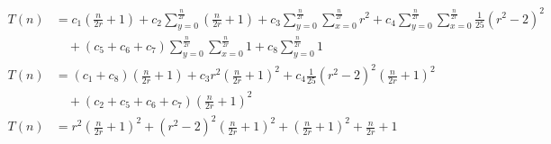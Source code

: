 \begin{subequations}
\label{eq:linedetection-clarke}
\begin{align}
\label{eq:linedetection-clarke-1}
T(n)& = c_{1} (\tfrac{n}{2r} + 1) + c_{2} \sum_{y=0}^{\tfrac{n}{2r}}
 \left(\tfrac{n}{2r} + 1\right) + c_3 \sum_{y=0}^{\tfrac{n}{2r}}
 \sum_{x=0}^{\tfrac{n}{2r}} r^2 + c_4 \sum_{y=0}^{\tfrac{n}{2r}}
 \sum_{x=0}^{\tfrac{n}{2r}} \tfrac{1}{25}(r^2 - 2)^2 \\
& \quad + (c_{5} + c_{6} + c_{7}) \sum_{y=0}^{\tfrac{n}{2r}} \sum_{x=0}^{\tfrac{n}{2r}} 1
+ c_8 \sum_{y=0}^{\tfrac{n}{2r}} 1 \nonumber \\
\label{eq:linedetection-clarke-2}
T(n)& = (c_{1} + c_{8}) (\tfrac{n}{2r} + 1) + c_{3} r^2 (\tfrac{n}{2r} + 1)^2
+ c_{4} \tfrac{1}{25} (r^2 - 2)^2 (\tfrac{n}{2r} + 1)^2 \\
& \quad + (c_{2} + c_{5} + c_{6} + c_{7}) (\tfrac{n}{2r} + 1)^2 \nonumber \\
\label{eq:linedetection-clarke-2}
T(n)& = r^2(\tfrac{n}{2r} + 1)^2 + (r^2 - 2)^2 (\tfrac{n}{2r} + 1)^2 + (\tfrac{n}{2r} + 1)^2 + \tfrac{n}{2r} + 1
\end{align}
\end{subequations}
